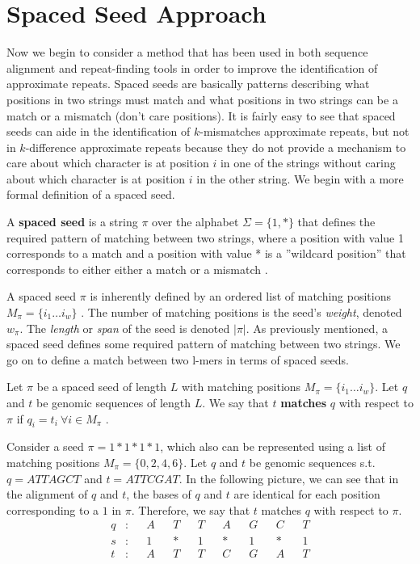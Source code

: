 \section{Spaced Seed Approach}
Now we begin to consider a method that has been used in both sequence alignment and repeat-finding tools in order to improve the identification of approximate repeats. Spaced seeds are basically patterns describing what positions in two strings must match and what positions in two strings can be a match or a mismatch (don't care positions). It is fairly easy to see that spaced seeds can aide in the identification of $k$-mismatches approximate repeats, but not in $k$-difference approximate repeats because they do not provide a mechanism to care about which character is at position $i$ in one of the strings without caring about which character is at position $i$ in the other string. We begin with a more formal definition of a spaced seed.

\begin{defn}
A \textbf{spaced seed} is a string $\pi$ over the alphabet $\Sigma =\lbrace 1,* \rbrace$ that defines the required pattern of matching between two strings, where
a position with value 1 corresponds to a match and a position with value * is a ”wildcard position” that corresponds to either
either a match or a mismatch \cite{chao2008sequence}. \end{defn}

A spaced seed $\pi$ is inherently defined by an ordered list of matching positions $M_{\pi} = \lbrace i_{1} \dotsc i_{w} \rbrace$ \cite{buhler2005designing}. The number of matching positions is the seed's \textit{weight}, denoted $w_{\pi}$. The \textit{length} or \textit{span} of the seed is denoted $\lvert \pi \rvert$. As previously mentioned, a spaced seed defines some required pattern of matching between two strings. We go on to define a match between two l-mers in terms of spaced seeds. 

\begin{defn}
Let $\pi$ be a spaced seed of length $L$ with matching positions $M_{\pi} = \lbrace i_{1} \dotsc i_{w} \rbrace$. Let $q$ and $t$ be genomic sequences of length $L$. We say that $t$ \textbf{matches} $q$ with respect to $\pi$ if $q_{i} = t_{i} \ \forall i \in M_{\pi}$ \cite{buhler2005designing}.
\end{defn}

\begin{example}
Consider a seed $\pi=1*1*1*1$, which also can be represented using a list of matching positions $M_{\pi} = \lbrace 0, 2, 4, 6 \rbrace$. Let $q$ and $t$ be genomic sequences s.t. $q=ATTAGCT$ and $t=ATTCGAT$. In the following picture, we can see that in the alignment of $q$ and $t$, the bases of $q$ and $t$ are identical for each position corresponding to a $1$ in $\pi$. Therefore, we say that $t$ matches $q$ with respect to $\pi$.
\begin{align*}
q &: && A && T && T && A && G && C && T \\
s &: && 1 && * && 1 && * && 1 && * && 1 \\
t &: && A && T && T && C && G && A && T \\
\end{align*}
\end{example}

